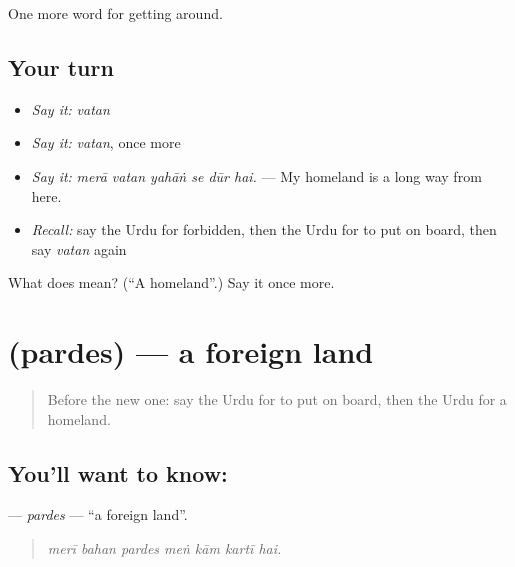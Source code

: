 \begin{grammarlens}[title={What you've built}]
One more word for getting around.
\end{grammarlens}

\subsection*{Your turn}
\begin{itemize}
\raggedright
  \item \emph{Say it:} \emph{vatan}
  \item \emph{Say it:} \emph{vatan}, once more
  \item \emph{Say it:} \emph{merā vatan yahāṅ se dūr hai.} — My homeland is a long way from here.
  \item \emph{Recall:} say the Urdu for forbidden, then the Urdu for to put on board, then say \emph{vatan} again
\end{itemize}

\begin{tcolorbox}[breakable,colback=teal!4,colframe=teal!35!black,title={Before you move on}]
What does  mean? (\textquotedblleft{}A homeland\textquotedblright{}.) Say it once more.
\end{tcolorbox}
\section[\texorpdfstring{\ur{پردیس} (pardes)}{پردیس (pardes)}]{ (pardes) — a foreign land}

\label{lesson:UR-C400-pardes}



\begin{quote}
Before the new one: say the Urdu for to put on board, then the Urdu for a homeland.
\end{quote}

\subsection*{You'll want to know: }
\textbf{} — \emph{pardes} — \textquotedblleft{}a foreign land\textquotedblright{}.

\begin{quote}
      
\end{quote}

\begin{quote}
\emph{merī bahan pardes meṅ kām kartī hai.}
\end{quote}

